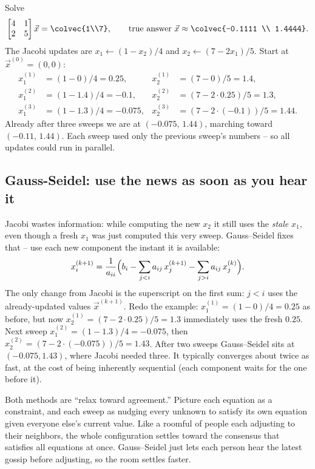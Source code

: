 \begin{example}
\label{ch33:jacobi}
Solve
\[
  \begin{bmatrix} 4 & 1 \\ 2 & 5 \end{bmatrix}\vec{x} = \colvec{1\\7},
  \qquad\text{true answer } \vec{x}\approx\colvec{-0.1111 \\ 1.4444}.
\]
The Jacobi updates are $x_1 \leftarrow (1 - x_2)/4$ and $x_2 \leftarrow (7-2x_1)/5$.
Start at $\vec{x}^{(0)}=(0,0)$:
\[
  \begin{aligned}
  x_1^{(1)} &= (1-0)/4 = 0.25, & x_2^{(1)} &= (7-0)/5 = 1.4,\\
  x_1^{(2)} &= (1-1.4)/4 = -0.1, & x_2^{(2)} &= (7-2\cdot 0.25)/5 = 1.3,\\
  x_1^{(3)} &= (1-1.3)/4 = -0.075, & x_2^{(3)} &= (7-2\cdot(-0.1))/5 = 1.44.
  \end{aligned}
\]
Already after three sweeps we are at $(-0.075,\,1.44)$, marching toward
$(-0.11,\,1.44)$. Each sweep used only the previous sweep's numbers -- so all updates
could run in parallel.
\end{example}

\subsection{Gauss-Seidel: use the news as soon as you hear it}

Jacobi wastes information: while computing the new $x_2$ it still uses the \emph{stale}
$x_1$, even though a fresh $x_1$ was just computed this very sweep. Gauss--Seidel fixes
that -- use each new component the instant it is available:
\[
  x_i^{(k+1)} = \frac{1}{a_{ii}}\Bigl(b_i - \sum_{j<i} a_{ij}\,x_j^{(k+1)}
     - \sum_{j>i} a_{ij}\,x_j^{(k)}\Bigr).
\]
The only change from Jacobi is the superscript on the first sum: $j<i$ uses the
already-updated values $\vec{x}^{(k+1)}$. Redo the example: $x_1^{(1)}=(1-0)/4=0.25$ as
before, but now $x_2^{(1)}=(7-2\cdot 0.25)/5 = 1.3$ immediately uses the fresh $0.25$.
Next sweep $x_1^{(2)}=(1-1.3)/4=-0.075$, then $x_2^{(2)}=(7-2\cdot(-0.075))/5=1.43$.
After two sweeps Gauss--Seidel sits at $(-0.075,1.43)$, where Jacobi needed three. It
typically converges about twice as fast, at the cost of being inherently sequential
(each component waits for the one before it).

\begin{intuitionbox}
Both methods are ``relax toward agreement.'' Picture each equation as a constraint, and
each sweep as nudging every unknown to satisfy its own equation given everyone else's
current value. Like a roomful of people each adjusting to their neighbors, the whole
configuration settles toward the consensus that satisfies all equations at once.
Gauss--Seidel just lets each person hear the latest gossip before adjusting, so the
room settles faster.
\end{intuitionbox}

